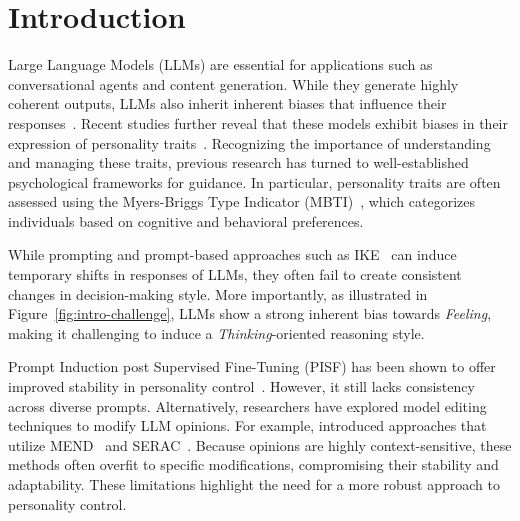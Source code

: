 \section{Introduction}

Large Language Models (LLMs) are essential for applications such as conversational agents and content generation. While they generate highly coherent outputs, LLMs also inherit inherent biases that influence their responses~\cite{perez-etal-2023-discovering}. Recent studies further reveal that these models exhibit biases in their expression of personality traits~\cite{chen2024extroversionintroversioncontrollingpersonality, mao2024editingpersonalitylargelanguage}. Recognizing the importance of understanding and managing these traits, previous research has turned to well-established psychological frameworks for guidance. In particular, personality traits are often assessed using the Myers-Briggs Type Indicator (MBTI)~\cite{10.1037/14404-000}, which categorizes individuals based on cognitive and behavioral preferences. 



While prompting and prompt-based approaches such as IKE~\cite{ike} can induce temporary shifts in responses of LLMs, they often fail to create consistent
changes in decision-making style.
More importantly, as illustrated in Figure~\ref{fig:intro-challenge}, LLMs show a strong inherent bias towards \textit{Feeling}, making it challenging to induce a \textit{Thinking}-oriented reasoning style.

Prompt Induction post Supervised Fine-Tuning (PISF) has been shown to offer improved stability in personality control~\cite{chen2024extroversionintroversioncontrollingpersonality}. However, it still lacks consistency across diverse prompts. Alternatively, researchers have explored model editing techniques to modify LLM opinions. For example, \citet{mao2024editingpersonalitylargelanguage} introduced approaches that utilize MEND~\cite{mitchell2022fastmodeleditingscale} and SERAC~\cite{mitchell2022memorybasedmodeleditingscale}. Because opinions are highly context-sensitive, these methods often overfit to specific modifications, compromising their stability and adaptability. These limitations highlight the need for a more robust approach to personality control.

